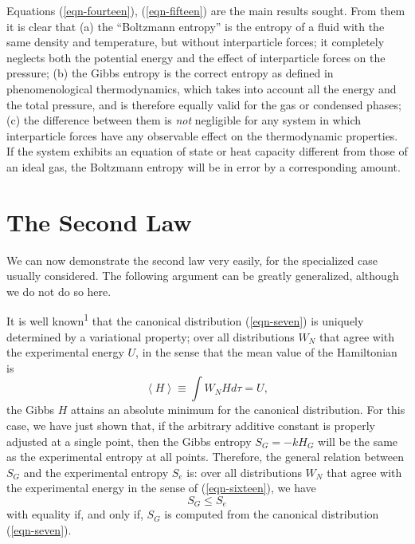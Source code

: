 \documentclass[twocolumn]{article}
\begin{document}
Equations (\ref{eqn-fourteen}), (\ref{eqn-fifteen}) are the main
results sought. From them it is clear that (a) the ``Boltzmann
entropy'' is the entropy of a fluid with the same density and
temperature, but without interparticle forces; it completely neglects
both the potential energy and the effect of interparticle forces on
the pressure; (b) the Gibbs entropy is the correct entropy as defined
in phenomenological thermodynamics, which takes into account all the
energy and the total pressure, and is therefore equally valid for the
gas or condensed phases; (c) the difference between them is \emph{not}
negligible for any system in which interparticle forces have any
observable effect on the thermodynamic properties. If the system
exhibits an equation of state or heat capacity different from those of
an ideal gas, the Boltzmann entropy will be in error by a
corresponding amount.

\section{The Second Law}\label{sec-the-second-law}

We can now demonstrate the second law very easily, for the specialized
case usually considered. The following argument can be greatly
generalized, although we do not do so here.

It is well known\textsuperscript{1} that the canonical distribution (\ref{eqn-seven})
is uniquely determined by a variational property; over all distributions
\(W_{N}\) that agree with the experimental energy \(U\), in the sense
that the mean value of the Hamiltonian is
%
\begin{equation}
\left\langle H \right\rangle \equiv \int W_{N}H{d\tau} = U,
\label{eqn-sixteen}
\end{equation}
%
the Gibbs \(H\) attains an absolute minimum for the canonical
distribution. For this case, we have just shown that, if the arbitrary
additive constant is properly adjusted at a single point, then the Gibbs
entropy \(S_{G} = - kH_{G}\) will be the same as the experimental
entropy at all points. Therefore, the general relation between \(S_{G}\)
and the experimental entropy \(S_{e}\) is: over all distributions
\(W_{N}\) that agree with the experimental energy in the sense of (\ref{eqn-sixteen}),
we have
%
\begin{equation}
S_{G} \leq S_{e}
\label{eqn-seventeen}
\end{equation}
%
with equality if, and only if, \(S_{G}\) is computed from the canonical
distribution (\ref{eqn-seven}).
\end{document}
